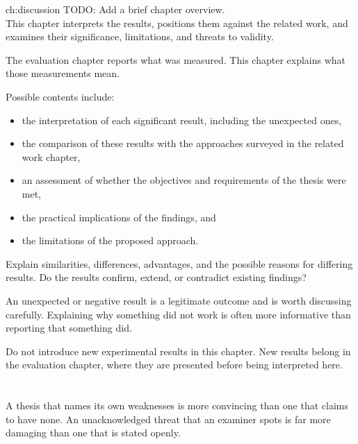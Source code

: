 \ThesisChapter
  {}
  {ch:discussion}
  {TODO: Add a brief chapter overview. \\
  This chapter interprets the results, positions them against the related work, and examines their significance, limitations, and threats to validity.}


The evaluation chapter reports what was measured.
This chapter explains what those measurements mean.

Possible contents include:
\begin{itemize}
  \item the interpretation of each significant result, including the unexpected ones,
  \item the comparison of these results with the approaches surveyed in the related work chapter,
  \item an assessment of whether the objectives and requirements of the thesis were met,
  \item the practical implications of the findings, and
  \item the limitations of the proposed approach.
\end{itemize}

Explain similarities, differences, advantages, and the possible reasons for differing results.
Do the results confirm, extend, or contradict existing findings?

An unexpected or negative result is a legitimate outcome and is worth discussing carefully.
Explaining why something did not work is often more informative than reporting that something did.

Do not introduce new experimental results in this chapter.
New results belong in the evaluation chapter, where they are presented before being interpreted here.

\section{}
\label{sec:threats-to-validity}


A thesis that names its own weaknesses is more convincing than one that claims to have none.
An unacknowledged threat that an examiner spots is far more damaging than one that is stated openly.

